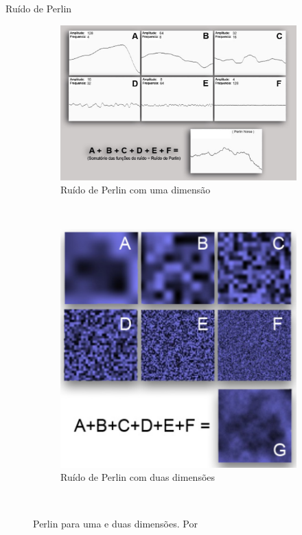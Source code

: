 \begin{frame}{Ruído de Perlin}
    
    \begin{figure}
        \centering
        \begin{subfigure}[b]{0.6\textwidth}
            \includegraphics[width=\textwidth]{img/perlin1d}
            \caption{Ruído de Perlin com uma dimensão}
            \label{fig:perlin1d}
        \end{subfigure}
        ~ %
        \begin{subfigure}[b]{0.35\textwidth}
            \includegraphics[width=\textwidth]{img/perlin2d}
            \caption{Ruído de Perlin com duas dimensões}
            \label{fig:perlin2d}
        \end{subfigure}
        ~ %
        \caption{Perlin para uma e duas dimensões. Por \cite{elias2000perlin}}
        \label{fig:perlin1d2d}
    \end{figure}
    
\end{frame}

